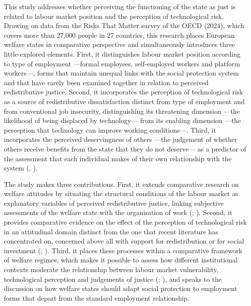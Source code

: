 \documentclass[
  12pt,
]{article}
\begin{document}
This study addresses whether perceiving the functioning of the state as
just is related to labour market position and the perception of
technological risk. Drawing on data from the Risks That Matter survey of
the OECD (2024), which covers more than 27,000 people in 27 countries,
this research places European welfare states in comparative perspective
and simultaneously introduces three little-explored elements. First, it
distinguishes labour market position according to type of employment
---formal employees, self-employed workers and platform workers---,
forms that maintain unequal links with the social protection system and
that have rarely been examined together in relation to perceived
redistributive justice. Second, it incorporates the perception of
technological risk as a source of redistributive dissatisfaction
distinct from type of employment and from conventional job insecurity,
distinguishing its threatening dimension ---the likelihood of being
displaced by technology--- from its enabling dimension ---the perception
that technology can improve working conditions---. Third, it
incorporates the perceived deservingness of others ---the judgement of
whether others receive benefits from the state that they do not
deserve--- as a predictor of the assessment that each individual makes
of their own relationship with the system
(,
).

The study makes three contributions. First, it extends comparative
research on welfare attitudes by situating the structural conditions of
the labour market as explanatory variables of perceived redistributive
justice, linking subjective assessments of the welfare state with the
organisation of work (; ).
Second, it provides comparative evidence on the effect of the perception
of technological risk in an attitudinal domain distinct from the one
that recent literature has concentrated on, concerned above all with
support for redistribution or for social investment
(;
).
Third, it places these processes within a comparative framework of
welfare regimes, which makes it possible to assess how different
institutional contexts moderate the relationship between labour market
vulnerability, technological perception and judgements of justice
(;
), and speaks to
the discussion on how welfare states should adapt social protection to
employment forms that depart from the standard employment relationship.
\end{document}
